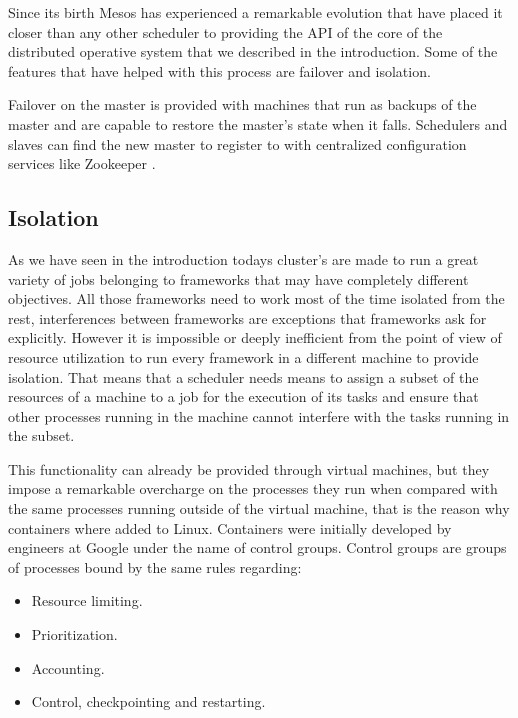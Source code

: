 \documentclass{report}                     %
\begin{document}
Since its birth Mesos has experienced a remarkable evolution that have
placed it closer than any other scheduler to providing the API of the
core of the distributed operative system that we described in the
introduction. Some of the features that have helped with this process
are failover and isolation.

Failover on the master is provided with machines that run as backups of the master and
are capable to restore the master's state when it falls. Schedulers and slaves can find
the new master to register to with centralized configuration services like Zookeeper \cite{_apache_????}.

\subsection{Isolation}

As we have seen in the introduction todays cluster's are made to run a
great variety of jobs belonging to frameworks that may have completely
different objectives. All those frameworks need to work most of the
time isolated from the rest, interferences between frameworks are
exceptions that frameworks ask for explicitly. However it is
impossible or deeply inefficient from the point of view of resource
utilization to run every framework in a different machine to provide
isolation. That means that a scheduler needs means to assign a subset
of the resources of a machine to a job for the execution of its tasks
and ensure that other processes running in the machine cannot
interfere with the tasks running in the subset.

This functionality can already be provided through virtual machines,
but they impose a remarkable overcharge on the processes they run when
compared with the same processes running outside of the virtual
machine, that is the reason why containers where added to
Linux. Containers were initially developed by engineers at Google
under the name of control groups. Control groups are groups of
processes bound by the same rules regarding: \\

\begin{itemize}
  \item Resource limiting.
  \item Prioritization.
  \item Accounting.
  \item Control, checkpointing and restarting.
\end{itemize}
\end{document}
